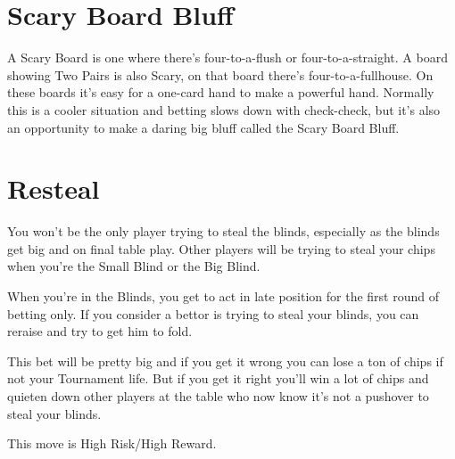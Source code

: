 \section{Scary Board Bluff}

A Scary Board is one where there's four-to-a-flush or four-to-a-straight.
A board showing Two Pairs is also Scary, on that board there's
four-to-a-fullhouse.  On these boards it's easy for a one-card hand
to make a powerful hand. Normally this is a cooler situation and
betting slows down with check-check, but it's also an opportunity
to make a daring big bluff called the Scary Board Bluff.

\section{Resteal}

You won't be the only player trying to steal the blinds, especially
as the blinds get big and on final table play. Other players will
be trying to steal your chips when you're the Small Blind or the
Big Blind.

When you're in the Blinds, you get to act in late position for
the first round of betting only. If you consider a bettor is
trying to steal your blinds, you can reraise and try to
get him to fold.

This bet will be pretty big and if you get it wrong you can
lose a ton of chips if not your Tournament life. But if you get
it right you'll win a lot of chips and quieten down other
players at the table who now know it's not a pushover to steal
your blinds.

This move is High Risk/High Reward.
